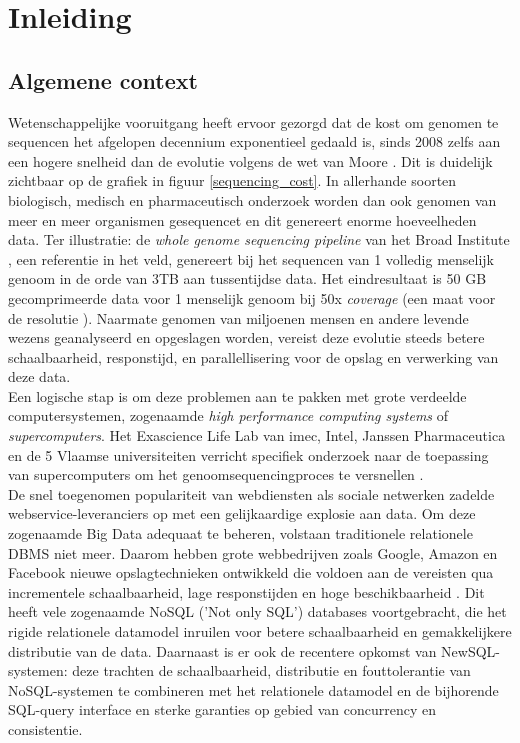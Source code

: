 \chapter{Inleiding}
\label{inleiding}

\section{Algemene context}

Wetenschappelijke vooruitgang heeft ervoor gezorgd dat de kost om genomen te sequencen het afgelopen decennium exponentieel gedaald is, sinds 2008 zelfs aan een hogere snelheid dan de evolutie volgens de wet van Moore \cite{wetterstrand_sequencing_cost}. Dit is duidelijk zichtbaar op de grafiek in figuur \ref{sequencing_cost}. In allerhande soorten biologisch, medisch en pharmaceutisch onderzoek worden dan ook genomen van meer en meer organismen gesequencet en dit genereert enorme hoeveelheden data. Ter illustratie: de \textit{whole genome sequencing pipeline} van het Broad Institute \cite{broad_institute}, een referentie in het veld, genereert bij het sequencen van 1 volledig menselijk genoom in de orde van 3TB aan tussentijdse data. Het eindresultaat is 50 GB gecomprimeerde data voor 1 menselijk genoom bij 50x \textit{coverage} (een maat voor de resolutie \cite{coverage_definition}). Naarmate genomen van miljoenen mensen en andere levende wezens geanalyseerd en opgeslagen worden, vereist deze evolutie steeds betere schaalbaarheid, responstijd, en parallellisering voor de opslag en verwerking van deze data.\\

Een logische stap is om deze problemen aan te pakken met grote verdeelde computersystemen, zogenaamde \textit{high performance computing systems} of \textit{supercomputers}. Het Exascience Life Lab van imec, Intel, Janssen Pharmaceutica en de 5 Vlaamse universiteiten verricht specifiek onderzoek naar de toepassing van supercomputers om het genoomsequencingproces te versnellen \cite{lifelab_bwa}\cite{exascience_life_lab}.\\
De snel toegenomen populariteit van webdiensten als sociale netwerken zadelde webservice-leveranciers op met een gelijkaardige explosie aan data. Om deze zogenaamde Big Data \cite{mashey1997big} adequaat te beheren, volstaan traditionele relationele DBMS niet meer. Daarom hebben grote webbedrijven zoals Google, Amazon en Facebook nieuwe opslagtechnieken ontwikkeld die voldoen aan de vereisten qua incrementele schaalbaarheid, lage responstijden en hoge beschikbaarheid \cite{baker2011megastore}. Dit heeft vele zogenaamde NoSQL ('Not only SQL') databases voortgebracht, die het rigide relationele datamodel inruilen voor betere schaalbaarheid en gemakkelijkere distributie van de data. Daarnaast is er ook de recentere opkomst van NewSQL-systemen: deze trachten de schaalbaarheid, distributie en fouttolerantie van NoSQL-systemen te combineren met het relationele datamodel en de bijhorende SQL-query interface en sterke garanties op gebied van concurrency en consistentie.

